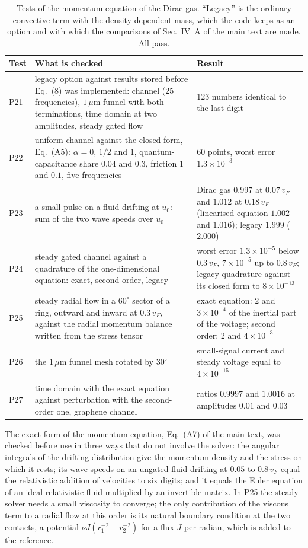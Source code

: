 \documentclass[aps,prapplied,onecolumn,superscriptaddress,floatfix]{revtex4-2}
\newcommand{\um}{\,\mu\mathrm{m}}
\begin{document}
\begin{table}[ht]
\caption{Tests of the momentum equation of the Dirac gas. ``Legacy'' is
the ordinary convective term with the density-dependent mass, which the
code keeps as an option and with which the comparisons of Sec.~IV~A of
the main text are made. All pass.}
\begin{ruledtabular}
\begin{tabular}{lp{}p{}}
Test & What is checked & Result \\
\hline
P21 & legacy option against results stored before Eq.~(8) was implemented: channel (25 frequencies), $1\um$ funnel with both terminations, time domain at two amplitudes, steady gated flow & 123 numbers identical to the last digit \\
P22 & uniform channel against the closed form, Eq.~(A5): $\alpha=0$, $1/2$ and $1$, quantum-capacitance share $0.04$ and $0.3$, friction $1$ and $0.1$, five frequencies & 60 points, worst error $1.3\times10^{-3}$ \\
P23 & a small pulse on a fluid drifting at $u_{0}$: sum of the two wave speeds over $u_{0}$ & Dirac gas $0.997$ at $0.07\,v_{F}$ and $1.012$ at $0.18\,v_{F}$ (linearised equation $1.002$ and $1.016$); legacy $1.999$ ($2.000$) \\
P24 & steady gated channel against a quadrature of the one-dimensional equation: exact, second order, legacy & worst error $1.3\times10^{-5}$ below $0.3\,v_{F}$, $7\times10^{-5}$ up to $0.8\,v_{F}$; legacy quadrature against its closed form to $8\times10^{-13}$ \\
P25 & steady radial flow in a $60^{\circ}$ sector of a ring, outward and inward at $0.3\,v_{F}$, against the radial momentum balance written from the stress tensor & exact equation: $2$ and $3\times10^{-4}$ of the inertial part of the voltage; second order: $2$ and $4\times10^{-3}$ \\
P26 & the $1\um$ funnel mesh rotated by $30^{\circ}$ & small-signal current and steady voltage equal to $4\times10^{-15}$ \\
P27 & time domain with the exact equation against perturbation with the second-order one, graphene channel & ratios $0.9997$ and $1.0016$ at amplitudes $0.01$ and $0.03$ \\
\end{tabular}
\end{ruledtabular}
\end{table}

The exact form of the momentum equation, Eq.~(A7) of the main text, was
checked before use in three ways that do not involve the solver: the
angular integrals of the drifting distribution give the momentum density
and the stress on which it rests; its wave speeds on an ungated fluid
drifting at $0.05$ to $0.8\,v_{F}$ equal the relativistic addition of
velocities to six digits; and it equals the Euler equation of an ideal
relativistic fluid multiplied by an invertible matrix. In P25 the steady
solver needs a small viscosity to converge; the only contribution of the
viscous term to a radial flow at this order is its natural boundary
condition at the two contacts, a potential
$\nu J(r_{1}^{-2}-r_{2}^{-2})$ for a flux $J$ per radian, which is added
to the reference.
\end{document}
